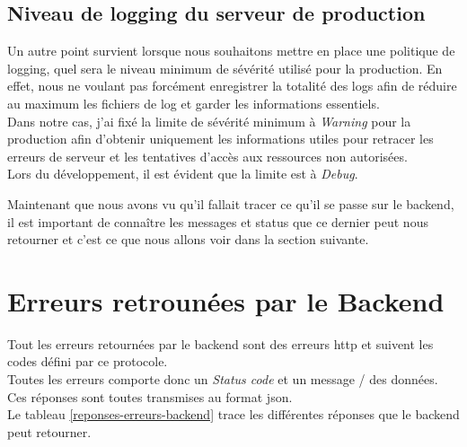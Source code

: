\documentclass[
    iai, %
    il, %
]{heig-tb}
\begin{document}
\subsection{Niveau de logging du serveur de production}
Un autre point survient lorsque nous souhaitons mettre en place une politique de logging, quel sera le niveau minimum de sévérité utilisé pour la production. En effet, nous ne voulant pas forcément enregistrer la totalité des logs afin de réduire au maximum les fichiers de log et garder les informations essentiels. \\
Dans notre cas, j'ai fixé la limite de sévérité minimum à \emph{Warning} pour la production afin d'obtenir uniquement les informations utiles pour retracer les erreurs de serveur et les tentatives d'accès aux ressources non autorisées. \\
Lors du développement, il est évident que la limite est à \emph{Debug}.

Maintenant que nous avons vu qu'il fallait tracer ce qu'il se passe sur le \Gls{backend}, il est important de connaître les messages et status que ce dernier peut nous retourner et c'est ce que nous allons voir dans la section suivante.

\section{Erreurs retrounées par le Backend}
Tout les erreurs retournées par le \Gls{backend} sont des erreurs \Gls{http} et suivent les codes défini par ce protocole. \\
Toutes les erreurs comporte donc un \emph{Status code} et un message / des données. Ces réponses sont toutes transmises au format \Gls{json}. \\
Le tableau \ref{reponses-erreurs-backend} trace les différentes réponses que le \Gls{backend} peut retourner.
\end{document}
